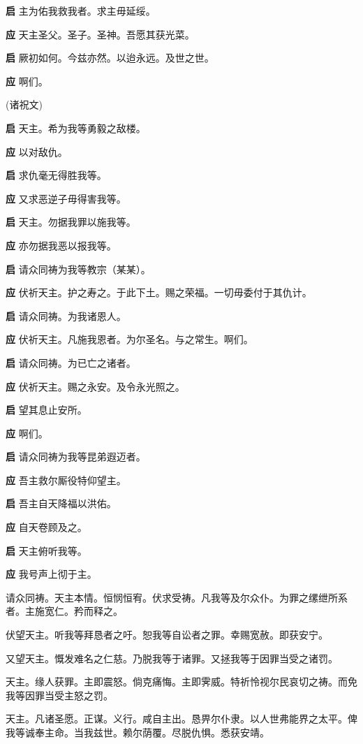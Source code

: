 \documentclass[UTF8,17pt]{ctexart}
\begin{document}
\textbf{启} \quad 主为佑我救我者。求主⽏延绥。

\textbf{应} \quad 天主圣⽗。圣⼦。圣神。吾愿其获光菜。

\textbf{启} \quad 厥初如何。今兹亦然。以迨永远。及世之世。

\textbf{应} \quad 啊们。

(诸祝⽂)

\textbf{启} \quad 天主。希为我等勇毅之敌楼。

\textbf{应} \quad 以对敌仇。

\textbf{启} \quad 求仇毫⽆得胜我等。

\textbf{应} \quad 又求恶逆⼦⽏得害我等。

\textbf{启} \quad 天主。勿据我罪以施我等。

\textbf{应} \quad 亦勿据我恶以报我等。

\textbf{启} \quad 请众同祷为我等教宗（某某）。

\textbf{应} \quad 伏祈天主。护之寿之。于此下⼟。赐之荣福。⼀切⽏委付于其仇计。

\textbf{启} \quad 请众同祷。为我诸恩⼈。

\textbf{应} \quad 伏祈天主。凡施我恩者。为尔圣名。与之常⽣。啊们。

\textbf{启} \quad 请众同祷。为已亡之诸者。

\textbf{应} \quad 伏祈天主。赐之永安。及令永光照之。

\textbf{启} \quad 望其息⽌安所。

\textbf{应} \quad 啊们。

\textbf{启} \quad 请众同祷为我等昆弟遐迈者。

\textbf{应} \quad 吾主救尔厮役特仰望主。

\textbf{启} \quad 吾主⾃天降福以洪佑。

\textbf{应} \quad ⾃天卷顾及之。

\textbf{启} \quad 天主俯听我等。

\textbf{应} \quad 我号声上彻于主。

请众同祷。天主本情。恒悯恒宥。伏求受祷。凡我等及尔众仆。为罪之缧绁所系者。主施宽仁。矜⽽释之。

伏望天主。听我等拜恳者之吁。恕我等⾃讼者之罪。幸赐宽赦。即获安宁。

又望天主。慨发难名之仁慈。乃脱我等于诸罪。又拯我等于因罪当受之诸罚。

天主。缘⼈获罪。主即震怒。倘克痛悔。主即霁威。特祈怜视尔民哀切之祷。⽽免我等因罪当受主怒之罚。

天主。凡诸圣愿。正谋。义⾏。咸⾃主出。恳畀尔仆⾪。以⼈世弗能界之太平。俾我等诚奉主命。当我兹世。赖尔荫覆。尽脱仇惧。悉获安靖。
\end{document}
